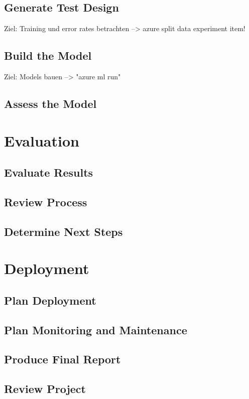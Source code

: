 \subsection{Generate Test Design}
Ziel: Training und error rates betrachten
--> azure split data experiment item!

\subsection{Build the Model}
Ziel: Models bauen
--> "azure ml run"

\subsection{Assess the Model}


\section{Evaluation}
\subsection{Evaluate Results}
\subsection{Review Process}
\subsection{Determine Next Steps}


\section{Deployment}
\subsection{Plan Deployment}
\subsection{Plan Monitoring and Maintenance}
\subsection{Produce Final Report}
\subsection{Review Project}


